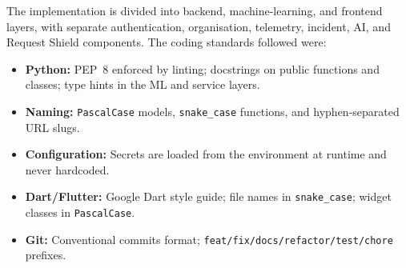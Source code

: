 The implementation is divided into backend, machine-learning, and frontend
layers, with separate authentication, organisation, telemetry, incident, AI,
and Request Shield components.  The coding standards followed were:
\begin{itemize}
  \item \textbf{Python:} PEP~8 enforced by linting; docstrings on public
        functions and classes; type hints in the ML and service layers.
  \item \textbf{Naming:} \texttt{PascalCase} models, \texttt{snake\_case}
        functions, and hyphen-separated URL slugs.
  \item \textbf{Configuration:} Secrets are loaded from the environment at
        runtime and never hardcoded.
  \item \textbf{Dart/Flutter:} Google Dart style guide; file names in
        \texttt{snake\_case}; widget classes in \texttt{PascalCase}.
  \item \textbf{Git:} Conventional commits format;
        \texttt{feat/fix/docs/refactor/test/chore} prefixes.
\end{itemize}

